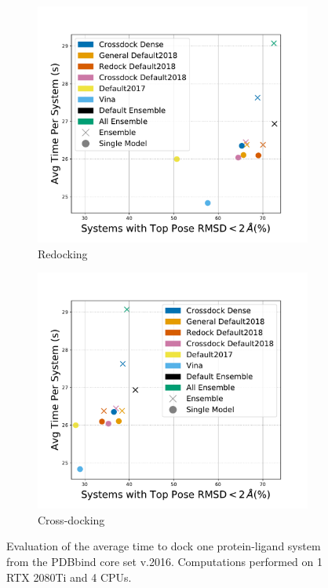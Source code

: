 \documentclass[journal=jcisd8,manuscript=article]{achemso}
\begin{document}
\begin{figure}    
        \begin{subfigure}[b]{0.48\textwidth}
                \centering
                \includegraphics[width=\textwidth]{figures/redocking/gpu_models_line_rescore.pdf}
                \caption{Redocking}
                \label{fig:OptimalRescRD}
        \end{subfigure}    
        \begin{subfigure}[b]{0.48\textwidth}
                \centering
                \includegraphics[width=\textwidth]{figures/crossdocking/gpu_models_line_rescore.pdf}
                \caption{Cross-docking}
                \label{fig:OptimalRescCD}
        \end{subfigure}    
        \caption{Evaluation of the average time to dock one protein-ligand system from the PDBbind core set v.2016. Computations performed on 1 RTX 2080Ti and 4 CPUs. }
        \label{fig:OptimalRescore}
\end{figure}    
\end{document}
